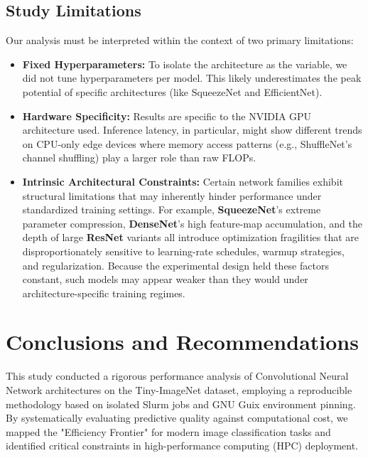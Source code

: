 \documentclass[acmsmall]{acmart}
\begin{document}
\subsection{Study Limitations}
Our analysis must be interpreted within the context of two primary limitations:
\begin{itemize}
    \item \textbf{Fixed Hyperparameters:} To isolate the architecture as the variable, we did not tune hyperparameters per model. This likely underestimates the peak potential of specific architectures (like SqueezeNet and EfficientNet).
    \item \textbf{Hardware Specificity:} Results are specific to the NVIDIA GPU architecture used. Inference latency, in particular, might show different trends on CPU-only edge devices where memory access patterns (e.g., ShuffleNet's channel shuffling) play a larger role than raw FLOPs.
    \item \textbf{Intrinsic Architectural Constraints:} Certain network families exhibit structural limitations that may inherently hinder performance under standardized training settings. For example, \textbf{SqueezeNet}'s extreme parameter compression, \textbf{DenseNet}'s high feature-map accumulation, and the depth of large \textbf{ResNet} variants all introduce optimization fragilities that are disproportionately sensitive to learning-rate schedules, warmup strategies, and regularization. Because the experimental design held these factors constant, such models may appear weaker than they would under architecture-specific training regimes.
\end{itemize}

\section{Conclusions and Recommendations}

This study conducted a rigorous performance analysis of Convolutional Neural Network architectures on the Tiny-ImageNet dataset, employing a reproducible methodology based on isolated Slurm jobs and GNU Guix environment pinning. By systematically evaluating predictive quality against computational cost, we mapped the "Efficiency Frontier" for modern image classification tasks and identified critical constraints in high-performance computing (HPC) deployment.
\end{document}
